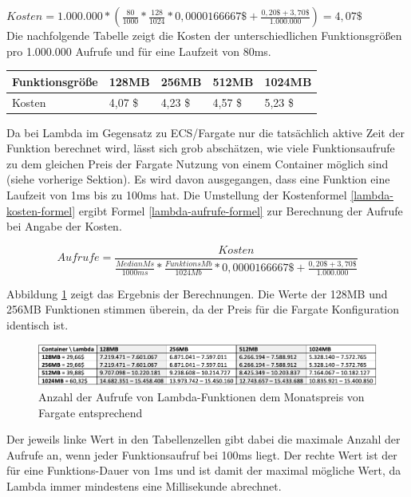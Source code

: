 \noindent
$Kosten = 1.000.000 * \left(\frac{80}{1000}*\frac{128}{1024} * 0,0000166667\$ + \frac{0,20\$ + 3,70\$}{1.000.000}\right) = 4,07\$$ \\

Die nachfolgende Tabelle zeigt die Kosten der unterschiedlichen Funktionsgrößen pro 1.000.000 Aufrufe und für eine Laufzeit von 80ms.

\begin{table}[H]
\label{lambda-kosten-70ms-1000000aufrufe}
\begin{tabular}{lllll}
\hline
Funktionsgröße & 128MB   & 256MB   & 512MB   & 1024MB  \\ \hline
Kosten         & 4,07 \$ & 4,23 \$ & 4,57 \$ & 5,23 \$ \\ \hline
\end{tabular}
\end{table}

Da bei Lambda im  Gegensatz zu ECS/Fargate nur die tatsächlich aktive Zeit der Funktion berechnet wird, lässt sich grob abschätzen, wie viele Funktionsaufrufe zu dem gleichen Preis der Fargate Nutzung von einem Container möglich sind (siehe vorherige Sektion). Es wird davon ausgegangen, dass eine Funktion eine Laufzeit von 1ms bis zu 100ms hat. Die Umstellung der Kostenformel \ref{lambda-kosten-formel} ergibt Formel \ref{lambda-aufrufe-formel} zur Berechnung der Aufrufe bei Angabe der Kosten.

\begin{equation}
\label{lambda-aufrufe-formel}
Aufrufe = \frac{Kosten}{\frac{MedianMs}{1000ms} * \frac{FunktionsMb}{1024Mb} * 0,0000166667\$ + \frac{0,20\$ + 3,70\$}{1.000.000}}
\end{equation}

Abbildung \ref{fig:lambda-max-invocations} zeigt das Ergebnis der Berechnungen. Die Werte der 128MB und 256MB Funktionen stimmen überein, da der Preis für die Fargate Konfiguration identisch ist.

\begin{figure}[H]
    \includegraphics[width=\textwidth]{img/lambda-max-invocations.png}
    \caption[Anzahl der Aufrufe von Lambda-Funktionen dem Monatspreis von Fargate entsprechend]{Anzahl der Aufrufe von Lambda-Funktionen dem Monatspreis von Fargate entsprechend}
    \label{fig:lambda-max-invocations}
\end{figure}

Der jeweils linke Wert in den Tabellenzellen gibt dabei die maximale Anzahl der Aufrufe an, wenn jeder Funktionsaufruf bei 100ms liegt. Der rechte Wert ist der für eine Funktions-Dauer von 1ms und ist damit der maximal mögliche Wert, da Lambda immer mindestens eine Millisekunde abrechnet.